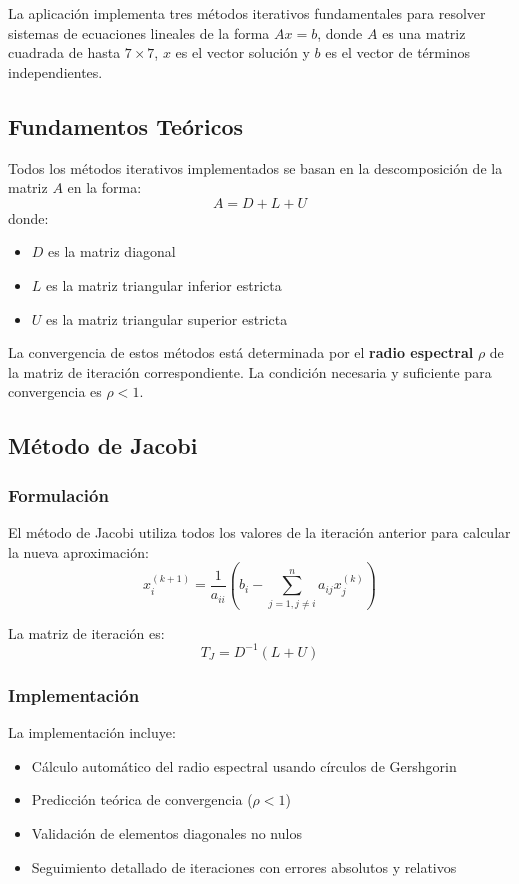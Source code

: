 La aplicación implementa tres métodos iterativos fundamentales para resolver sistemas de ecuaciones lineales de la forma $Ax = b$, donde $A$ es una matriz cuadrada de hasta $7 \times 7$, $x$ es el vector solución y $b$ es el vector de términos independientes.

\subsection{Fundamentos Teóricos}

Todos los métodos iterativos implementados se basan en la descomposición de la matriz $A$ en la forma:
\[
A = D + L + U
\]
donde:
\begin{itemize}
    \item $D$ es la matriz diagonal
    \item $L$ es la matriz triangular inferior estricta
    \item $U$ es la matriz triangular superior estricta
\end{itemize}

La convergencia de estos métodos está determinada por el \textbf{radio espectral} $\rho$ de la matriz de iteración correspondiente. La condición necesaria y suficiente para convergencia es $\rho < 1$.

\subsection{Método de Jacobi}

\subsubsection{Formulación}
El método de Jacobi utiliza todos los valores de la iteración anterior para calcular la nueva aproximación:
\[
x_i^{(k+1)} = \frac{1}{a_{ii}}\left(b_i - \sum_{j=1, j \neq i}^{n} a_{ij} x_j^{(k)}\right)
\]

La matriz de iteración es:
\[
T_J = D^{-1}(L + U)
\]

\subsubsection{Implementación}
La implementación incluye:
\begin{itemize}
    \item Cálculo automático del radio espectral usando círculos de Gershgorin
    \item Predicción teórica de convergencia ($\rho < 1$)
    \item Validación de elementos diagonales no nulos
    \item Seguimiento detallado de iteraciones con errores absolutos y relativos
\end{itemize}

